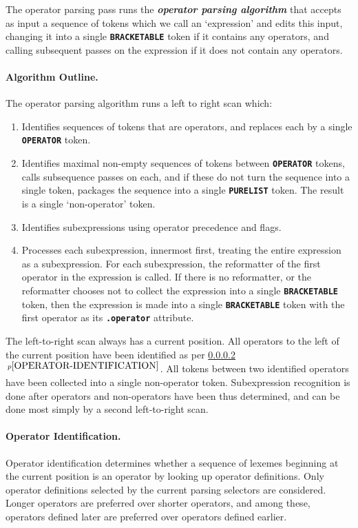 \documentclass[12pt]{article}
\makeatletter
\newcommand{\subsubsubsection}[1]{\paragraph[#1]{#1.}}
\newcommand{\TT}[1]{{\tt \bfseries #1}}
\newcommand{\key}[1]{{\bf \em #1}\index{#1}}
\newcommand{\ttkey}[1]{\TT{#1}\index{#1@\TT{#1}}}
\newcommand{\itemref}[1]{\ref{#1}$\,^{p\pageref{#1}}$}
\makeatother
\begin{document}
The operator parsing pass runs the \key{operator parsing algorithm}
that accepts as input a sequence of tokens
which we call an `expression'
and edits this input, changing it into a single \TT{BRACKETABLE} token
if it contains any operators, and calling subsequent passes on the
expression if it does not contain any operators.

\subsubsubsection{Algorithm Outline}

The operator parsing algorithm runs a left to right scan which:
\begin{enumerate}
\item Identifies sequences of tokens that are operators, and
replaces each by a single \ttkey{OPERATOR} token.
\item Identifies maximal non-empty sequences of tokens between \TT{OPERATOR}
tokens, calls subsequence passes on each, and if these do not
turn the sequence into a single token, packages the sequence into
a single \TT{PURELIST} token.  The result is a single `non-operator'
token.
\item Identifies subexpressions using operator precedence and flags.
\item Processes each subexpression, innermost first, treating the
entire expression as a subexpression.  For each subexpression,
the reformatter of the first operator in the expression is called.
If there is no reformatter, or the reformatter chooses not to
collect the expression into a single \TT{BRACKETABLE} token, then
the expression is made into a single \TT{BRACKETABLE} token
with the first operator as its \TT{.operator} attribute.
\end{enumerate}


The left-to-right scan always has a current position.
All operators to the left of the current position have been
identified as per \itemref{OPERATOR-IDENTIFICATION}.
All tokens between two identified operators have been collected
into a single non-operator token.
Subexpression recognition is done after operators
and non-operators have been thus determined, and can be done
most simply by a second left-to-right scan.

\subsubsubsection{Operator Identification}
\label{OPERATOR-IDENTIFICATION}

Operator identification determines whether a sequence of lexemes
beginning at the current position is an operator by looking up
operator definitions.  Only
operator definitions selected by the current parsing selectors are
considered.  Longer operators are preferred over shorter
operators, and among these, operators defined later are
preferred over operators defined earlier.
\end{document}
